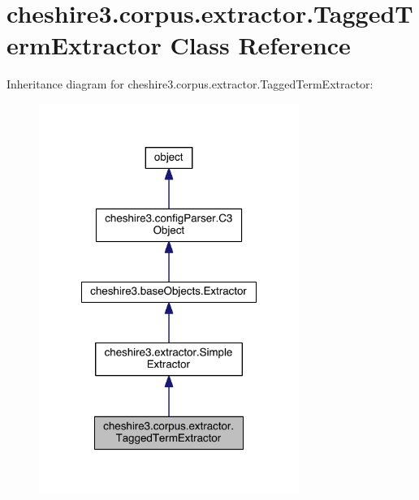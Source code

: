 \hypertarget{classcheshire3_1_1corpus_1_1extractor_1_1_tagged_term_extractor}{\section{cheshire3.\-corpus.\-extractor.\-Tagged\-Term\-Extractor Class Reference}
\label{classcheshire3_1_1corpus_1_1extractor_1_1_tagged_term_extractor}
}


Inheritance diagram for cheshire3.\-corpus.\-extractor.\-Tagged\-Term\-Extractor\-:
\nopagebreak
\begin{figure}[H]
\begin{center}
\leavevmode
\includegraphics[width=240pt]{classcheshire3_1_1corpus_1_1extractor_1_1_tagged_term_extractor__inherit__graph}
\end{center}
\end{figure}


